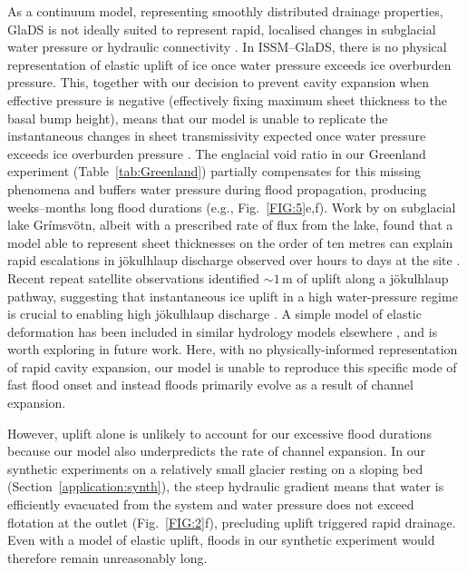 \documentclass[tc, manuscript]{copernicus}
\begin{document}
As a continuum model, representing smoothly distributed drainage properties, GlaDS is not ideally suited to represent rapid, localised changes in subglacial water pressure or hydraulic connectivity \citep{rada2018channelized,hill2025emulator}. In ISSM--GlaDS, there is no physical representation of elastic uplift of ice once water pressure exceeds ice overburden pressure. This, together with our decision to prevent cavity expansion when effective pressure is negative (effectively fixing maximum sheet thickness to the basal bump height), means that our model is unable to replicate the instantaneous changes in sheet transmissivity expected once water pressure exceeds ice overburden pressure \citep[e.g.,][]{tsai2010model,schoof2012flotation,dow2015modeling,magnusson2026subglacial}. The englacial void ratio in our Greenland experiment (Table~\ref{tab:Greenland}) partially compensates for this missing phenomena and buffers water pressure during flood propagation, producing weeks--months long flood durations (e.g., Fig.~\ref{FIG:5}e,f). Work by \citet{flowers2004coupled} on subglacial lake Grímsvötn, albeit with a prescribed rate of flux from the lake, found that a model able to represent sheet thicknesses on the order of ten metres can explain rapid escalations in jökulhlaup discharge observed over hours to days at the site \citep{haraldsson1997vatnajokull}. Recent repeat satellite observations identified $\sim 1 \,\mathrm{m}$ of uplift along a jökulhlaup pathway, suggesting that instantaneous ice uplift in a high water-pressure regime is crucial to enabling high jökulhlaup discharge \citep{magnusson2026subglacial}. A simple model of elastic deformation has been included in similar hydrology models elsewhere \citep[e.g.,][]{stevens2022tidewater}, and is worth exploring in future work. Here, with no physically-informed representation of rapid cavity expansion, our model is unable to reproduce this specific mode of fast flood onset and instead floods primarily evolve as a result of channel expansion. 

However, uplift alone is unlikely to account for our excessive flood durations because our model also underpredicts the rate of channel expansion. In our synthetic experiments on a relatively small glacier resting on a sloping bed (Section~\ref{application:synth}), the steep hydraulic gradient means that water is efficiently evacuated from the system and water pressure does not exceed flotation at the outlet (Fig.~\ref{FIG:2}f), precluding uplift triggered rapid drainage. Even with a model of elastic uplift, floods in our synthetic experiment would therefore remain unreasonably long. 
\end{document}
